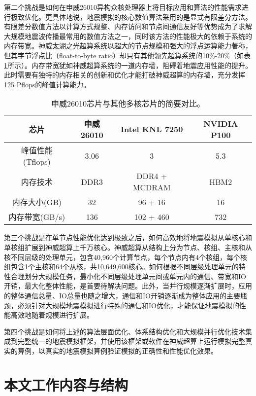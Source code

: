 第二个挑战是如何在申威26010异构众核处理器上将目标应用和算法的性能需求进行极致优化。更具体地说，地震模拟的核心数值算法采用的是显式有限差分方法。有限差分数值方法以计算方式规整、内存访问和节点间通信友好等优势成为了求解大规模地震波传播最常用的数值方法之一，同时该方法的性能极大的依赖于系统的内存带宽。神威太湖之光超算系统以超大的节点规模和强大的浮点运算能力著称，但其字节浮点比（float-to-byte ratio）却只有其他领先超算系统的10\%-20\%（如表\ref{tb:proc-comp}所示）。内存带宽犹如神威超算系统的一道内存墙，阻碍着地震应用性能的提升。此时需要有独特的内存相关的创新和优化才能打破神威超算的内存墙，充分发挥125 Pflops的峰值计算能力。

\begin{table}[ht]
\caption{申威26010芯片与其他多核芯片的简要对比。}
\label{tb:proc-comp}
\centering
\begin{tabular*}{0.8\columnwidth}{cccc}
\hline\hline
    芯片 & 申威26010 & Intel KNL 7250 & NVIDIA P100 \\\hline
    峰值性能 (Tflops) & 3.06 & 3 & 5.3 \\\hline
    内存技术   & DDR3 & DDR4 + MCDRAM & HBM2 \\\hline
    内存大小(GB) & 32 & 96 + 16 & 16 \\\hline
    内存带宽(GB/s)  & 136 & 102 + 460 & 732 \\\hline
\hline
\end{tabular*}
\end{table}

第三个挑战是在单节点性能优化达到极致之后，如何高效地将地震模拟从单核心和单核组扩展到神威超算上千万核心。神威超算从结构上分为节点、核组、主核和从核不同层级的处理单元，包含40,960个计算节点，每个节点内有4个核组，每个核组包含1个主核和64个从核，共10,649,600核心。如何根据不同层级处理单元的特性合理划分大规模任务，最小化不同层级处理单元间或单元内的通信、带宽和IO开销，最大化整体性能，是首要待解决问题。此外，当并行规模逐渐扩展时，应用的整体通信总量、IO总量也随之增大，通信和IO开销逐渐成为整体应用的主要瓶颈，必须针对大规模地震模拟进行特殊的通信和IO优化，才能保证地震模拟的性能高效地随着规模进行扩展。

第四个挑战是如何将上述的算法层面优化、体系结构优化和大规模并行优化技术集成到完整统一的地震模拟框架，并使用该框架或软件在神威超算上运行模拟完整真实的算例，以真实的地震模拟算例验证模拟的正确性和性能优化效果。

\section{本文工作内容与结构}

